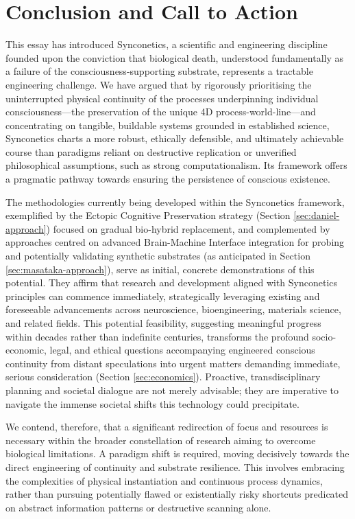 \documentclass[10pt]{article}
\begin{document}
\begin{sloppypar}
  \section{Conclusion and Call to Action}
  \label{sec:conclusion}

  This essay has introduced Synconetics, a scientific and engineering discipline founded upon the conviction that biological death, understood fundamentally as a failure of the consciousness-supporting substrate, represents a tractable engineering challenge. We have argued that by rigorously prioritising the uninterrupted physical continuity of the processes underpinning individual consciousness—the preservation of the unique 4D process-world-line—and concentrating on tangible, buildable systems grounded in established science, Synconetics charts a more robust, ethically defensible, and ultimately achievable course than paradigms reliant on destructive replication or unverified philosophical assumptions, such as strong computationalism. Its framework offers a pragmatic pathway towards ensuring the persistence of conscious existence.

  The methodologies currently being developed within the Synconetics framework, exemplified by the Ectopic Cognitive Preservation strategy (Section \ref{sec:daniel-approach}) focused on gradual bio-hybrid replacement, and complemented by approaches centred on advanced Brain-Machine Interface integration for probing and potentially validating synthetic substrates (as anticipated in Section \ref{sec:masataka-approach}), serve as initial, concrete demonstrations of this potential. They affirm that research and development aligned with Synconetics principles can commence immediately, strategically leveraging existing and foreseeable advancements across neuroscience, bioengineering, materials science, and related fields. This potential feasibility, suggesting meaningful progress within decades rather than indefinite centuries, transforms the profound socio-economic, legal, and ethical questions accompanying engineered conscious continuity from distant speculations into urgent matters demanding immediate, serious consideration (Section \ref{sec:economics}). Proactive, transdisciplinary planning and societal dialogue are not merely advisable; they are imperative to navigate the immense societal shifts this technology could precipitate.

  We contend, therefore, that a significant redirection of focus and resources is necessary within the broader constellation of research aiming to overcome biological limitations. A paradigm shift is required, moving decisively towards the direct engineering of continuity and substrate resilience. This involves embracing the complexities of physical instantiation and continuous process dynamics, rather than pursuing potentially flawed or existentially risky shortcuts predicated on abstract information patterns or destructive scanning alone.


\end{sloppypar}
\end{document}
